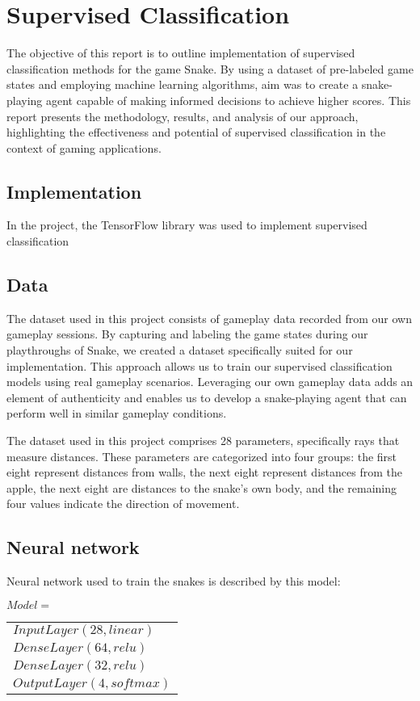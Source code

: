 \section{Supervised Classification}
\label{sec:supervised_classification}
The objective of this report is to outline implementation of supervised classification methods for the game Snake. By using a dataset of pre-labeled game states and employing machine learning algorithms, aim was to create a snake-playing agent capable of making informed decisions to achieve higher scores. This report presents the methodology, results, and analysis of our approach, highlighting the effectiveness and potential of supervised classification in the context of gaming applications.
\subsection{Implementation}
In the project, the TensorFlow library was used to implement supervised classification

\subsection{Data}
The dataset used in this project consists of gameplay data recorded from our own gameplay sessions. By capturing and labeling the game states during our playthroughs of Snake, we created a dataset specifically suited for our implementation. This approach allows us to train our supervised classification models using real gameplay scenarios. Leveraging our own gameplay data adds an element of authenticity and enables us to develop a snake-playing agent that can perform well in similar gameplay conditions.

The dataset used in this project comprises 28 parameters, specifically rays that measure distances. These parameters are categorized into four groups: the first eight represent distances from walls, the next eight represent distances from the apple, the next eight are distances to the snake's own body, and the remaining four values indicate the direction of movement.

\subsection{Neural network}
Neural network used to train the snakes is described by this model:
\begin{center}
    $Model = $
    \begin{tabular}{l}
    $InputLayer(28, linear)$\\
    $DenseLayer(64, relu)$\\
    $DenseLayer(32, relu)$\\
    $OutputLayer(4, softmax)$
    \end{tabular}
\end{center}

